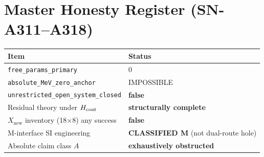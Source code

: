 
\section*{Master Honesty Register (SN-A311--A318)}
\begin{center}
\begin{tabular}{@{}p{7.6cm}p{5.0cm}@{}}
\toprule
\textbf{Item} & \textbf{Status} \\
\midrule
\texttt{free\_params\_primary} & $0$ \\
\texttt{absolute\_MeV\_zero\_anchor} & IMPOSSIBLE \\
\texttt{unrestricted\_open\_system\_closed} & \textbf{false} \\
Residual theory under $H_{\rm cont}$ & \textbf{structurally complete} \\
$X_{\mathrm{new}}$ inventory (18$\times$8) any success & \textbf{false} \\
M-interface SI engineering & \textbf{CLASSIFIED M} (not dual-route hole) \\
Absolute claim class $A$ & \textbf{exhaustively obstructed} \\
\bottomrule
\end{tabular}
\end{center}

